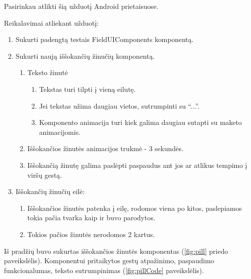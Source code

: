 Pasirinkau atlikti šią užduotį Android prietaisuose. 

Reikalavimai atliekant užduotį:
\begin{enumerate}
    \item Sukurti padengtą testais FieldUIComponents komponentą.
    \item Sukurti naują iššokančių žinučių komponentą.
    \begin{enumerate}
        \item Teksto žinutė
        \begin{enumerate}
            \item Tekstas turi tilpti į vieną eilutę.
            \item Jei tekstas užima daugiau vietos, sutrumpinti su \enquote{...}.
            \item Komponento animacija turi kiek galima daugiau sutapti su maketo animacijomis.
        \end{enumerate}
        \item Iššokančios žinutės animacijos trukmė - 3 sekundės.
        \item Iššokančią žinutę galima paslėpti paspaudus ant jos ar atlikus tempimo į viršų gestą.
    \end{enumerate}
    \item Iššokančių žinučių eilė:
    \begin{enumerate}
        \item Iššokančios žinutės patenka į eilę, rodomos viena po kitos, paslepiamos tokia pačia tvarka kaip ir buvo parodytos.
        \item Tokios pačios žinutės nerodomos 2 kartus.
    \end{enumerate}
\end{enumerate}
\newpage
Iš pradžių buvo sukurtas iššokančios žinutės komponentas (\ref{fig:pill} priedo paveikslėlis). Komponentui pritaikytos gestų atpažinimo, paspaudimo funkcionalumas, teksto sutrumpinimas (\ref{fig:pillCode} paveikslėlis).


